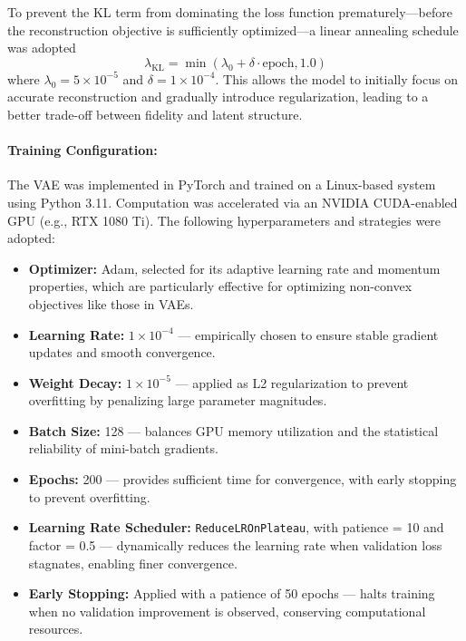To prevent the KL term from dominating the loss function prematurely—before the reconstruction objective is sufficiently optimized—a linear annealing schedule was adopted
\begin{equation}
\lambda_{\text{KL}} = \min(\lambda_0 + \delta \cdot \text{epoch}, 1.0)
\end{equation}
where $\lambda_0 = 5 \times 10^{-5}$ and $\delta = 1 \times 10^{-4}$. This allows the model to initially focus on accurate reconstruction and gradually introduce regularization, leading to a better trade-off between fidelity and latent structure.

\paragraph{Training Configuration:}

The VAE was implemented in PyTorch and trained on a Linux-based system using Python 3.11. Computation was accelerated via an NVIDIA CUDA-enabled GPU (e.g., RTX 1080 Ti). The following hyperparameters and strategies were adopted:

\begin{itemize}
    \item \textbf{Optimizer:} Adam, selected for its adaptive learning rate and momentum properties, which are particularly effective for optimizing non-convex objectives like those in VAEs.
    \item \textbf{Learning Rate:} $1 \times 10^{-4}$ — empirically chosen to ensure stable gradient updates and smooth convergence.
    \item \textbf{Weight Decay:} $1 \times 10^{-5}$ — applied as L2 regularization to prevent overfitting by penalizing large parameter magnitudes.
    \item \textbf{Batch Size:} 128 — balances GPU memory utilization and the statistical reliability of mini-batch gradients.
    \item \textbf{Epochs:} 200 — provides sufficient time for convergence, with early stopping to prevent overfitting.
    \item \textbf{Learning Rate Scheduler:} \texttt{ReduceLROnPlateau}, with patience = 10 and factor = 0.5 — dynamically reduces the learning rate when validation loss stagnates, enabling finer convergence.
    \item \textbf{Early Stopping:} Applied with a patience of 50 epochs — halts training when no validation improvement is observed, conserving computational resources.
\end{itemize}

